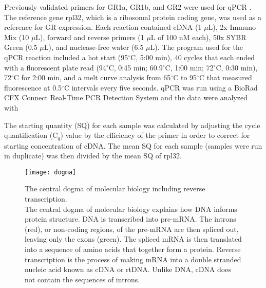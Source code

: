 \documentclass[12pt,twoside]{reedthesis}
\begin{document}
Previously validated primers for GR1a, GR1b, and GR2 were used for qPCR \citep{solomon-lane_early-life_2018}. The
reference gene rpl32, which is a ribosomal protein coding gene, was used as a
reference for GR expression. Each reaction contained cDNA (1 $\mu$L), 2x Immuno Mix (10 $\mu$L),
forward and reverse primers (1 $\mu$L of 100 nM each), 50x SYBR Green (0.5
$\mu$L), and nuclease-free water (6.5 $\mu$L). The program used for the qPCR
reaction included a hot start (95$^\circ$C, 5:00 min), 40 cycles that each
ended with a fluorescent plate read (94$^\circ$C, 0:45 min; 60.9$^\circ$C, 1:00
min; 72$^\circ$C, 0:30 min), 72$^\circ$C for 2:00 min, and a melt curve analysis from 65$^\circ$C to
95$^\circ$C that measured fluorescence at 0.5$^\circ$C intervals every five
seconds. qPCR was run using a BioRad CFX Connect Real-Time PCR Detection System
and the data were analyzed with

The starting quantity (SQ) for each sample was calculated by adjusting the cycle
quantification (C$_{q}$)
value by the efficiency of the primer in order to
correct for starting concentration of cDNA. The 
mean SQ for each sample (samples were run in duplicate) was then divided by the mean SQ
of rpl32.

\begin{figure}[htbp] 
\begin{center} 
\texttt{[image: dogma]}
\caption[The central dogma of molecular biology including reverse transcription]{\footnotesize{The
    central dogma of molecular biology including reverse transcription. \\ The
    central dogma of molecular biology explains how DNA informs protein
    structure. DNA is transcribed into pre-mRNA. The introns (red), or non-coding
    regions, of the pre-mRNA are then spliced out, leaving only the exons
    (green). The spliced mRNA is then translated into a sequence of amino acids
    that together form a protein. Reverse transcription is the process of making
  mRNA into a double stranded nucleic acid known as cDNA or rtDNA. Unlike DNA, cDNA
  does not contain the sequences of introns.}} 
\label{subd}
\end{center} 
\end{figure}
\end{document}

